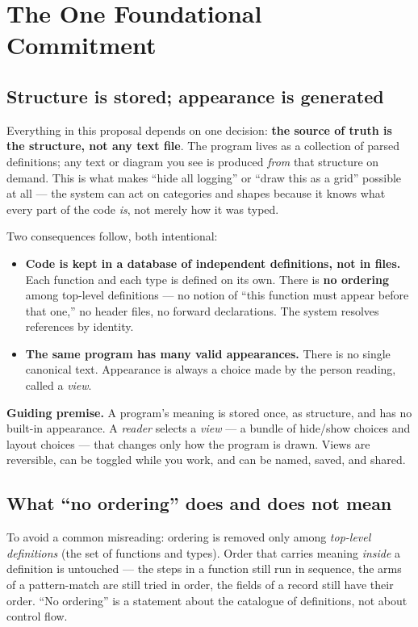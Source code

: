 \documentclass[11pt]{article}
\newcommand{\req}[1]{\textbf{\color{accent}#1}}
\begin{document}
\section{The One Foundational Commitment}

\subsection{Structure is stored; appearance is generated}
Everything in this proposal depends on one decision: \req{the source of truth is the structure, not any text file}. The program lives as a collection of parsed definitions; any text or diagram you see is produced \emph{from} that structure on demand. This is what makes ``hide all logging'' or ``draw this as a grid'' possible at all --- the system can act on categories and shapes because it knows what every part of the code \emph{is}, not merely how it was typed.

Two consequences follow, both intentional:

\begin{itemize}[leftmargin=1.4em,itemsep=3pt]
  \item \req{Code is kept in a database of independent definitions, not in files.} Each function and each type is defined on its own. There is \req{no ordering} among top-level definitions --- no notion of ``this function must appear before that one,'' no header files, no forward declarations. The system resolves references by identity.
  \item \req{The same program has many valid appearances.} There is no single canonical text. Appearance is always a choice made by the person reading, called a \emph{view}.
\end{itemize}

\begin{principle}
\textbf{Guiding premise.} A program's meaning is stored once, as structure, and has no built-in appearance. A \emph{reader} selects a \emph{view} --- a bundle of hide/show choices and layout choices --- that changes only how the program is drawn. Views are reversible, can be toggled while you work, and can be named, saved, and shared.
\end{principle}

\subsection{What ``no ordering'' does and does not mean}
To avoid a common misreading: ordering is removed only among \emph{top-level definitions} (the set of functions and types). Order that carries meaning \emph{inside} a definition is untouched --- the steps in a function still run in sequence, the arms of a pattern-match are still tried in order, the fields of a record still have their order. ``No ordering'' is a statement about the catalogue of definitions, not about control flow.
\end{document}
